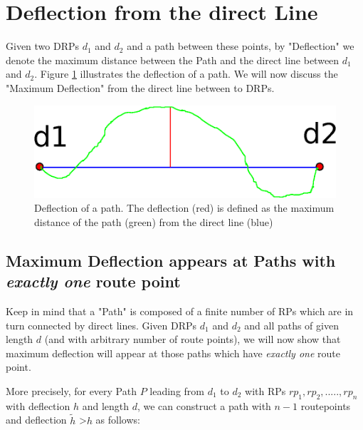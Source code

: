\section{Deflection from the direct Line}
Given two DRPs $d_1$ and $d_2$  and a path between these points,
by "Deflection" we denote the maximum distance between the Path and the direct line between $d_1$ and $d_2$.
Figure \ref{pic:deflectionDefinition} illustrates the deflection of a path.
We will now discuss the "Maximum Deflection" from the direct line between to DRPs.
\begin{figure}[t]
\includegraphics[scale=0.5]{images/03.01.deflection.eps}
\caption{Deflection of a path. The deflection (red) is defined as the maximum distance of the path (green) from the direct line (blue)}
\label{pic:deflectionDefinition} 
\end{figure}



\subsection{Maximum Deflection appears at Paths with \emph{exactly one} route point}
\label{Pathconstruction}

Keep in mind that a "Path" is composed of a finite number of RPs which are in turn connected by direct lines.
Given DRPs $d_1$ and $d_2$ and all paths of given length $d$ (and with arbitrary number of route points), 
we will now show that maximum deflection will appear at those paths which
have \emph{exactly one} route point.

More precisely, for every Path $P$ leading from $d_1$ to $d_2$ with RPs $rp_1,rp_2,.....,rp_n$ with deflection $h$ and length $d$, 
we can construct a path with $n-1$ routepoints and deflection $\tilde{h}$ \textgreater $h$ as follows:


